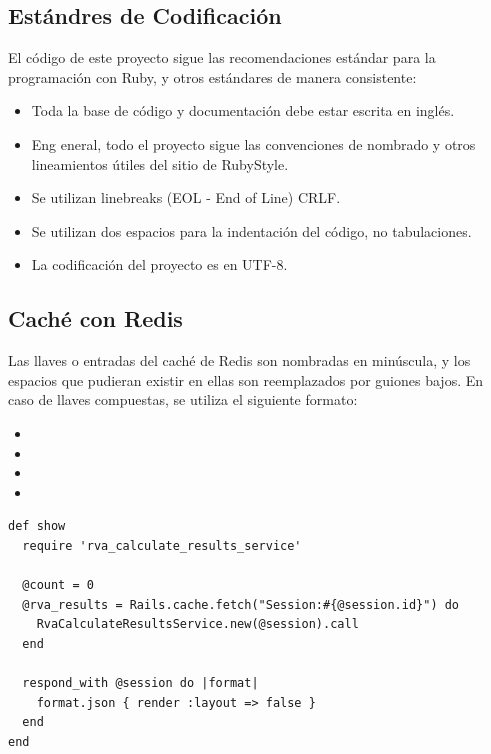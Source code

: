 \subsection{Estándres de Codificación}
El código de este proyecto sigue las recomendaciones estándar para la programación con Ruby, y otros estándares de manera consistente:
\begin{itemize}
  \item Toda la base de código y documentación debe estar escrita en inglés.
  \item Eng eneral, todo el proyecto sigue las convenciones de nombrado y otros lineamientos útiles del sitio de RubyStyle.
  \item Se utilizan linebreaks (EOL - End of Line) CRLF.
  \item Se utilizan dos espacios para la indentación del código, no tabulaciones.
  \item La codificación del proyecto es en UTF-8. 
\end{itemize}

\subsection{Caché con Redis}
Las llaves o entradas del caché de Redis son nombradas en minúscula, y los espacios que pudieran existir en ellas son reemplazados por guiones bajos. En caso de llaves compuestas, se utiliza el siguiente formato:

\begin{itemize}
  \item {}
  \item {}
  \item {}
  \item {}
\end{itemize}

\begin{longlisting}
  \begin{verbatim}  
def show
  require 'rva_calculate_results_service'
	
  @count = 0
  @rva_results = Rails.cache.fetch("Session:#{@session.id}") do
    RvaCalculateResultsService.new(@session).call
  end
	
  respond_with @session do |format|
    format.json { render :layout => false }
  end  
end
  \end{verbatim}
\end{longlisting}


